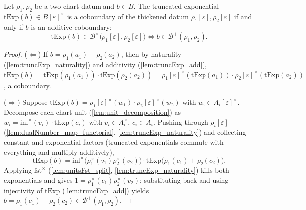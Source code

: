 \begin{theorem}
  \label{thm:truncExp_detects_coboundaries}
  \leanok
  Let \(\rho_1, \rho_2\) be a two-chart datum and \(b \in B\). The truncated
  exponential \(\mathrm{tExp}(b) \in B[\varepsilon]^\times\) is a coboundary of the
  thickened datum \(\rho_1[\varepsilon], \rho_2[\varepsilon]\) if and only if \(b\) is
  an additive coboundary:
  \[
    \mathrm{tExp}(b) \in \mathcal B^\times\bigl(\rho_1[\varepsilon],
      \rho_2[\varepsilon]\bigr)
    \iff
    b \in \mathcal B^+(\rho_1, \rho_2).
  \]
\end{theorem}
\begin{proof}
  \leanok
  (\(\Leftarrow\)) If \(b = \rho_1(a_1) + \rho_2(a_2)\), then by naturality
  (\ref{lem:truncExp_naturality}) and additivity (\ref{lem:truncExp_add}),
  \(\mathrm{tExp}(b) = \mathrm{tExp}(\rho_1(a_1)) \cdot \mathrm{tExp}(\rho_2(a_2)) =
  \rho_1[\varepsilon]^\times(\mathrm{tExp}(a_1)) \cdot
  \rho_2[\varepsilon]^\times(\mathrm{tExp}(a_2))\), a coboundary.

  (\(\Rightarrow\)) Suppose \(\mathrm{tExp}(b) =
  \rho_1[\varepsilon]^\times(w_1) \cdot \rho_2[\varepsilon]^\times(w_2)\) with
  \(w_i \in A_i[\varepsilon]^\times\). Decompose each chart unit
  (\ref{lem:unit_decomposition}) as
  \(w_i = \mathrm{inl}^\times(v_i)\cdot\mathrm{tExp}(c_i)\) with
  \(v_i \in A_i^\times\), \(c_i \in A_i\). Pushing through
  \(\rho_i[\varepsilon]\) (\ref{lem:dualNumber_map_functorial},
  \ref{lem:truncExp_naturality}) and collecting constant and exponential factors
  (truncated exponentials commute with everything and multiply additively),
  \[
    \mathrm{tExp}(b) = \mathrm{inl}^\times\bigl(\rho_1^\times(v_1)\rho_2^\times(v_2)\bigr)
      \cdot \mathrm{tExp}\bigl(\rho_1(c_1) + \rho_2(c_2)\bigr).
  \]
  Applying \(\mathrm{fst}^\times\) (\ref{lem:unitsFst_split},
  \ref{lem:truncExp_naturality}) kills both exponentials and gives
  \(1 = \rho_1^\times(v_1)\rho_2^\times(v_2)\); substituting back and using
  injectivity of \(\mathrm{tExp}\) (\ref{lem:truncExp_add}) yields
  \(b = \rho_1(c_1) + \rho_2(c_2) \in \mathcal B^+(\rho_1, \rho_2)\).
\end{proof}

